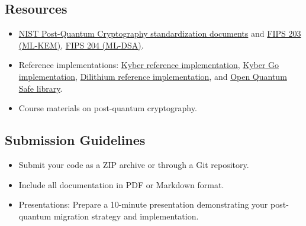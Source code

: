 \documentclass[10pt,a4paper,american]{exam}
\begin{document}
\subsection*{Resources}
\begin{itemize}
	\item \href{https://csrc.nist.gov/projects/post-quantum-cryptography/post-quantum-cryptography-standardization}{NIST Post-Quantum Cryptography standardization documents} and \href{https://nvlpubs.nist.gov/nistpubs/FIPS/NIST.FIPS.203.pdf}{FIPS 203 (ML-KEM)}, \href{https://nvlpubs.nist.gov/nistpubs/FIPS/NIST.FIPS.204.pdf}{FIPS 204 (ML-DSA)}.
	\item Reference implementations: \href{https://github.com/pq-crystals/kyber}{Kyber reference implementation}, \href{https://github.com/symbolicsoft/kyber-k2so}{Kyber Go implementation}, \href{https://github.com/pq-crystals/dilithium}{Dilithium reference implementation}, and \href{https://github.com/open-quantum-safe/liboqs}{Open Quantum Safe library}.
	\item Course materials on post-quantum cryptography.
\end{itemize}

\subsection*{Submission Guidelines}
\begin{itemize}
	\item Submit your code as a ZIP archive or through a Git repository.
	\item Include all documentation in PDF or Markdown format.
	\item Presentations: Prepare a 10-minute presentation demonstrating your post-quantum migration strategy and implementation.
\end{itemize}
\end{document}
